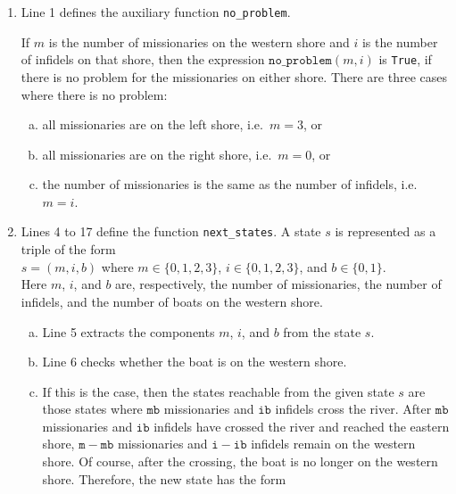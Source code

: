 \begin{enumerate}
\item Line 1 defines the auxiliary function \texttt{no\_problem}.

      If $m$ is the number of missionaries on the western shore and $i$ is the number of infidels on
      that shore, then the expression $\texttt{no\_problem}(m, i)$ is \texttt{True}, if there is no problem
      for the missionaries on either shore.  There are three cases where there is no problem:
      \begin{enumerate}[(a)]
      \item all missionaries are on the left  shore, i.e.~$m=3$, or 
      \item all missionaries are on the right shore, i.e.~$m=0$, or
      \item the number of missionaries is the same as the number of infidels, i.e.~$m=i$.
      \end{enumerate}
\item Lines 4 to 17 define the function \texttt{next\_states}.  A state $s$ is represented as a triple of
      the form
      \\[0.2cm]
      \hspace*{1.3cm}
      $s = (m, i, b)$ \quad where $m \in \{0,1,2,3\}$, $i \in \{0,1,2,3\}$, and $b \in\{0,1\}$.
      \\[0.2cm]
      Here $m$, $i$, and $b$ are, respectively, the number of missionaries, the number of infidels, and the number
      of boats on the western shore. 
      \begin{enumerate}[(a)]
      \item Line 5 extracts the components $m$, $i$, and $b$ from the state $s$.
      \item Line 6 checks whether the boat is on the western shore.
      \item If this is the case,  then the states reachable from the given state $s$ are those
            states where $\texttt{mb}$ missionaries and $\texttt{ib}$ infidels cross the river.
            After $\texttt{mb}$ missionaries and $\texttt{ib}$ infidels have crossed the river and
            reached the eastern shore, $\mathtt{m} - \mathtt{mb}$ missionaries and $\mathtt{i} - \mathtt{ib}$ infidels
            remain on the western shore.  Of course, after the crossing, the boat is no longer on the
            western shore.  Therefore, the new state has the form
            \\[0.2cm]
            \hspace*{1.3cm}

\end{enumerate}
\end{enumerate}
